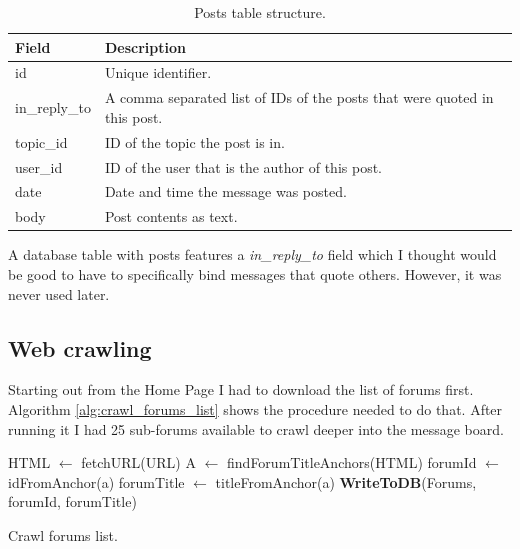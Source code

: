     \begin{table}[H]
      \begin{tabularx}{\textwidth}{|L{0.3}|L{1.7}|} \hline
         \textbf{Field} & \textbf{Description} \\\hline
        id & Unique identifier. \\
        in\_reply\_to & A comma separated list of IDs of the posts that were quoted in this post. \\
        topic\_id & ID of the topic the post is in. \\
        user\_id & ID of the user that is the author of this post. \\
        date & Date and time the message was posted. \\
        body & Post contents as text. \\\hline
      \end{tabularx}
      \caption{Posts table structure.}
    \end{table}
    
    A database table with posts features a \emph{in\_reply\_to} field which I thought would be good to have to specifically bind messages that quote others. However, it was never used later.
    
  \subsection{Web crawling}
    \label{sec:crawling}
    
      Starting out from the Home Page I had to download the list of forums first. Algorithm \ref{alg:crawl_forums_list} shows the procedure needed to do that. After running it I had 25 sub-forums available to crawl deeper into the message board.
  
    \begin{algorithm}[H]
      \begin{algorithmic}[1]
          \State HTML $\gets$ fetchURL(URL)
          \State A $\gets$ findForumTitleAnchors(HTML)
            \State forumId $\gets$ idFromAnchor(a)
            \State forumTitle $\gets$ titleFromAnchor(a)
            \State \textbf{WriteToDB}(Forums, forumId, forumTitle)
          \EndFor
        \EndProcedure
      \end{algorithmic}
      \caption{Crawl forums list.}
      \label{alg:crawl_forums_list}
    \end{algorithm}
    
